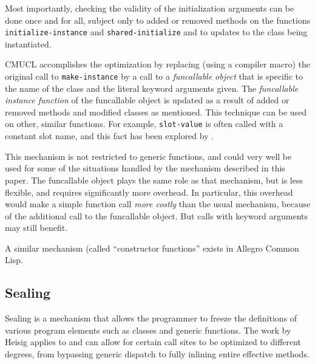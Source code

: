 Most importantly, checking the validity of the initialization
arguments can be done once and for all, subject only to added or
removed methods on the functions \texttt{initialize-instance} and
\texttt{shared-initialize} and to updates to the class being
instantiated.

CMUCL accomplishes the optimization by replacing (using a compiler
macro) the original call to \texttt{make-instance} by a call to a
\emph{funcallable object} that is specific to the name of the class
and the literal keyword arguments given.  The \emph{funcallable
  instance function} of the funcallable object is updated as a result
of added or removed methods and modified classes as mentioned.
This technique can be used on other, similar functions.  For example,
\texttt{slot-value} is often called with a constant slot name, and
this fact has been explored by \sbcl{}.

This mechanism is not restricted to generic functions, and could very
well be used for some of the situations handled by the mechanism
described in this paper.  The funcallable object plays the same role
as that mechanism, but is less flexible, and requires significantly
more overhead.  In particular, this overhead would make a simple
function call \emph{more costly} than the usual mechanism, because of
the additional call to the funcallable object.  But calls with keyword
arguments may still benefit.

A similar mechanism (called ``constructor functions'' exists in
Allegro Common Lisp.

\subsection{Sealing}

Sealing is a mechanism that allows the programmer to freeze the
definitions of various program elements such as classes and generic
functions.  The work by Heisig \cite{Heisig:2020:ELS:Sealable} applies
to \commonlisp{} and can allow for certain call sites to be
optimized to different degrees, from bypassing generic dispatch to
fully inlining entire effective methods.

